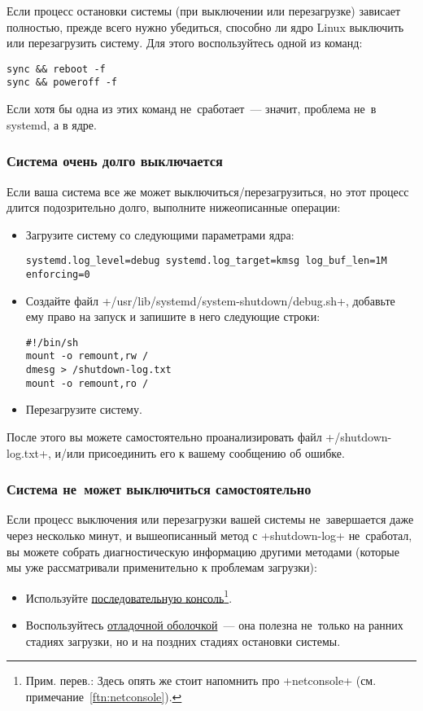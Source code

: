 \documentclass[10pt,oneside,a4paper]{article}
\begin{document}
Если процесс остановки системы (при выключении или перезагрузке) зависает
полностью, прежде всего нужно убедиться, способно ли ядро Linux выключить или
перезагрузить систему. Для этого воспользуйтесь одной из команд:
\begin{Verbatim}
sync && reboot -f
sync && poweroff -f
\end{Verbatim}

Если хотя бы одна из этих команд не~сработает~--- значит, проблема не~в systemd,
а в ядре.

\subsubsection{Система очень долго выключается}

Если ваша система все же может выключиться/перезагрузиться, но этот процесс
длится подозрительно долго, выполните нижеописанные операции:
\begin{itemize}
	\item Загрузите систему со следующими параметрами ядра:
\begin{Verbatim}
systemd.log_level=debug systemd.log_target=kmsg log_buf_len=1M enforcing=0
\end{Verbatim}
	
	\item Создайте файл +/usr/lib/systemd/system-shutdown/debug.sh+,
		добавьте ему право на запуск и запишите в него следующие строки:
\begin{Verbatim}
#!/bin/sh
mount -o remount,rw /
dmesg > /shutdown-log.txt
mount -o remount,ro /
\end{Verbatim}
	
	\item Перезагрузите систему.
\end{itemize}

После этого вы можете самостоятельно проанализировать файл +/shutdown-log.txt+,
и/или присоединить его к вашему сообщению об ошибке.

\subsubsection{Система не~может выключиться самостоятельно}

Если процесс выключения или перезагрузки вашей системы не~завершается даже через
несколько минут, и вышеописанный метод с +shutdown-log+ не~сработал, вы можете
собрать диагностическую информацию другими методами (которые мы уже
рассматривали применительно к проблемам загрузки):
\begin{itemize}
	\item Используйте \hyperlink{it:serial}{последовательную
		консоль}\footnote{Прим. перев.: Здесь опять же стоит напомнить
		про +netconsole+ (см. примечание~\ref{ftn:netconsole}).}.
	\item Воспользуйтесь \hyperlink{it:dbgshell}{отладочной оболочкой}~---
		она полезна не~только на ранних стадиях загрузки, но и на
		поздних стадиях остановки системы. 
\end{itemize}
\end{document}
